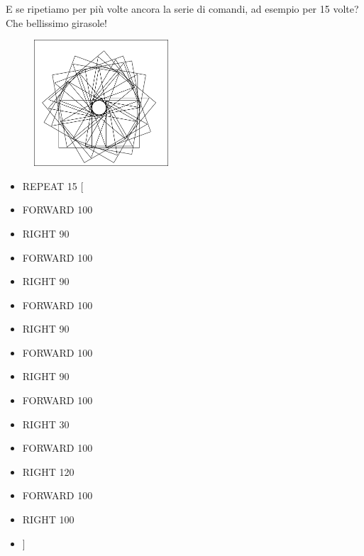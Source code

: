 E se ripetiamo per più volte ancora la serie di comandi, ad esempio per 15
volte? Che bellissimo girasole!

\begin{minipage}{0.5\textwidth}
\begin{figure}[H]
   \includegraphics[width=5.0cm,trim=4 4 6 4,clip]{./images/marta/mar-6.png}
   \label{mar-6}
\end{figure}
\end{minipage} \hfill
\begin{minipage}{0.45\textwidth}
\begin{itemize}[itemsep=-3pt,parsep=2pt]
\item[] \hspace{0.5cm} REPEAT 15 [
\item[] \hspace{0.5cm} 	FORWARD 100
\item[] \hspace{0.5cm} 	RIGHT 90
\item[] \hspace{0.5cm} 	FORWARD 100
\item[] \hspace{0.5cm} 	RIGHT 90
\item[] \hspace{0.5cm} 	FORWARD 100
\item[] \hspace{0.5cm} 	RIGHT 90
\item[] \hspace{0.5cm} 	FORWARD 100
\item[] \hspace{0.5cm} 	RIGHT 90
\item[] \hspace{0.5cm} 	FORWARD 100
\item[] \hspace{0.5cm} 	RIGHT 30
\item[] \hspace{0.5cm} 	FORWARD 100
\item[] \hspace{0.5cm} 	RIGHT 120
\item[] \hspace{0.5cm} 	FORWARD 100
\item[] \hspace{0.5cm} 	RIGHT 100
\item[] \hspace{0.5cm} 	]          
\end{itemize}
\end{minipage}

